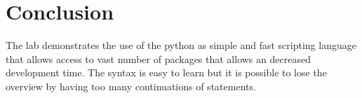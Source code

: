 \section{Conclusion}\label{sec: Conclusion}
The lab demonstrates the use of the python as simple and fast scripting language that allows access to vast number of packages that allows an decreased development time. The syntax is easy to learn but it is possible to lose the overview by having too many continuations of statements.


